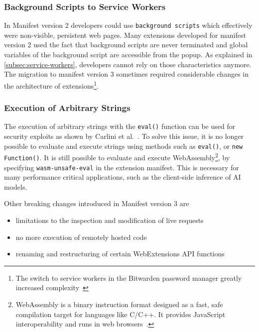 \subsubsection{Background Scripts to Service Workers}
In Manifest version 2 developers could use \verb|background scripts| which effectively were non-visible, persistent web pages.
Many extensions developed for manifest version 2 used the fact that background scripts are never terminated and global variables of the background script are accessible from the popup.
As explained in \cref{subsec:service-workers}, developers cannot rely on those characteristics anymore.
The migration to manifest version 3 sometimes required considerable changes in the architecture of extensions\footnote{
The switch to service workers in the Bitwarden password manager greatly increased complexity~\cite{gonzalez2024bitwarden}}.

\subsubsection{Execution of Arbitrary Strings}
The execution of arbitrary strings with the \verb|eval()| function can be used for security exploits as shown by Carlini et al.~\cite{carlini2012evaluation}.
To solve this issue, it is no longer possible to evaluate and execute strings using methods such as \verb|eval()|, or \verb|new Function()|.
It is still possible to evaluate and execute WebAssembly\footnote{WebAssembly is a binary instruction format designed as a fast, safe compilation target for languages like C/C++. It provides JavaScript interoperability and runs in web browsers~\cite{haas2017wasm}.}, by specifying \verb|wasm-unsafe-eval| in the extension manifest.
This is necessary for many performance critical applications, such as the client-side inference of AI models.

Other breaking changes introduced in Manifest version 3 are 
\begin{itemize}
    \item limitations to the inspection and modification of live requests
    \item no more execution of remotely hosted code
    \item renaming and restructuring of certain WebExtensions API functions
\end{itemize}

